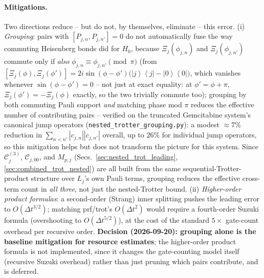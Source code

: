 \documentclass[11pt]{article}
\newcommand{\Dt}{\Delta t}
\newcommand{\calC}{\mathcal{C}}
\renewcommand{\ket}[1]{\left| #1 \right\rangle}
\renewcommand{\bra}[1]{\left\langle #1 \right|}
\begin{document}
\paragraph{Mitigations.} Two directions reduce -- but do not, by themselves, eliminate -- this error. (i) \emph{Grouping}: pairs with $[P_{j,n},P_{j,n'}]=0$ do not automatically fuse the way commuting Heisenberg bonds did for $H_0$, because $\Xi_j(\phi_{j,n})$ and $\Xi_j(\phi_{j,n'})$ commute only if \emph{also} $\phi_{j,n}\equiv\phi_{j,n'}\pmod\pi$ (from $[\Xi_j(\phi),\Xi_j(\phi')]=2i\sin(\phi-\phi')\big(\ket{j}\bra{j}-\ket0\bra0\big)$, which vanishes whenever $\sin(\phi-\phi')=0$ -- not just at exact equality: at $\phi'=\phi+\pi$, $\Xi_j(\phi')=-\Xi_j(\phi)$ exactly, so the two trivially commute too); grouping by both commuting Pauli support \emph{and} matching phase mod $\pi$ reduces the effective number of contributing pairs -- verified on the truncated Gemcitabine system's canonical jump operators (\texttt{nested\_trotter\_grouping.py}): a modest $\approx7\%$ reduction in $\sum_{n<n'}|c_{j,n}||c_{j,n'}|$ overall, up to $26\%$ for individual jump operators, so this mitigation helps but does not transform the picture for this system. Since $\calC_j^{(3)}$, $\calC_{j,00}$, and $M_{p,j}$ (Secs.~\ref{sec:nested_trot_leading}, \ref{sec:combined_trot_nested}) are all built from the same sequential-Trotter-product structure over $L_j$'s own Pauli terms, grouping reduces the effective cross-term count in \emph{all three}, not just the nested-Trotter bound. (ii) \emph{Higher-order product formulas}: a second-order (Strang) inner splitting pushes the leading error to $O(\Dt^{3/2})$; matching prf/trot's $O(\Dt^2)$ would require a fourth-order Suzuki formula (overshooting to $O(\Dt^{5/2})$), at the cost of the standard $5\times$ gate-count overhead per recursive order. \textbf{Decision (2026-09-20): grouping alone is the baseline mitigation for resource estimates}; the higher-order product formula is not implemented, since it changes the gate-counting model itself (recursive Suzuki overhead) rather than just pruning which pairs contribute, and is deferred.
\end{document}
